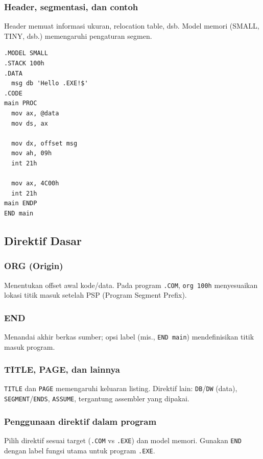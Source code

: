 \documentclass[../main.tex]{subfiles}
\begin{document}
            \subsubsection{Header, segmentasi, dan contoh}
Header memuat informasi ukuran, relocation table, dsb. Model memori (SMALL, TINY, dsb.) memengaruhi pengaturan segmen.
\begin{lstlisting}[language={[x86masm]Assembler}, caption={Contoh Struktur Program EXE}, label={lst:program-exe}]
.MODEL SMALL
.STACK 100h
.DATA
  msg db 'Hello .EXE!$'
.CODE
main PROC
  mov ax, @data
  mov ds, ax

  mov dx, offset msg
  mov ah, 09h
  int 21h

  mov ax, 4C00h
  int 21h
main ENDP
END main
\end{lstlisting}

        \subsection{Direktif Dasar}
            \subsubsection{ORG (Origin)}
Menentukan offset awal kode/data. Pada program \texttt{.COM}, \texttt{org 100h} menyesuaikan lokasi titik masuk setelah PSP (Program Segment Prefix).

            \subsubsection{END}
Menandai akhir berkas sumber; opsi label (mis., \texttt{END main}) mendefinisikan titik masuk program.

            \subsubsection{TITLE, PAGE, dan lainnya}
\texttt{TITLE} dan \texttt{PAGE} memengaruhi keluaran listing. Direktif lain: \texttt{DB}/\texttt{DW} (data), \texttt{SEGMENT}/\texttt{ENDS}, \texttt{ASSUME}, tergantung assembler yang dipakai.

            \subsubsection{Penggunaan direktif dalam program}
Pilih direktif sesuai target (\texttt{.COM} vs \texttt{.EXE}) dan model memori. Gunakan \texttt{END} dengan label fungsi utama untuk program \texttt{.EXE}.
\end{document}
